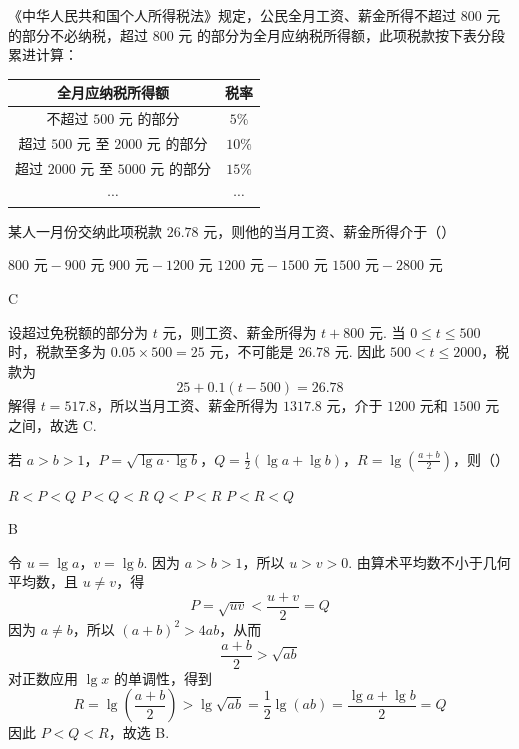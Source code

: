 \begin{problem}
《中华人民共和国个人所得税法》规定，公民全月工资、薪金所得不超过 \(800\text{ 元}\) 的部分不必纳税，超过 \(800\text{ 元}\) 的部分为全月应纳税所得额，此项税款按下表分段累进计算：

\begin{center}
\begin{tabular}{|c|c|}
\hline
全月应纳税所得额 & 税率 \\
\hline
不超过 \(500\text{ 元}\) 的部分 & \(5\%\) \\
\hline
超过 \(500\text{ 元}\) 至 \(2000\text{ 元}\) 的部分 & \(10\%\) \\
\hline
超过 \(2000\text{ 元}\) 至 \(5000\text{ 元}\) 的部分 & \(15\%\) \\
\hline
\(\cdots\) & \(\cdots\) \\
\hline
\end{tabular}
\end{center}

某人一月份交纳此项税款 \(26.78\text{ 元}\)，则他的当月工资、薪金所得介于（\quad）

\choices
    {\(800\text{ 元}-900\text{ 元}\)}
    {\(900\text{ 元}-1200\text{ 元}\)}
    {\(1200\text{ 元}-1500\text{ 元}\)}
    {\(1500\text{ 元}-2800\text{ 元}\)}
\end{problem}

\begin{answer}
C
\end{answer}

\begin{solution}
设超过免税额的部分为 \(t\) 元，则工资、薪金所得为 \(t+800\) 元. 当 \(0\leqslant t\leqslant500\) 时，税款至多为 \(0.05\times500=25\) 元，不可能是 \(26.78\) 元. 因此 \(500<t\leqslant2000\)，税款为
\[
25+0.1(t-500)=26.78
\]
解得 \(t=517.8\)，所以当月工资、薪金所得为 \(1317.8\) 元，介于 \(1200\) 元和 \(1500\) 元之间，故选 C.
\end{solution}

\begin{problem}
若 \(a>b>1\)，\(P=\sqrt{\lg a\cdot\lg b}\)，\(Q=\frac12\left(\lg a+\lg b\right)\)，\(R=\lg\left(\frac{a+b}{2}\right)\)，则（\quad）

\choices
    {\(R<P<Q\)}
    {\(P<Q<R\)}
    {\(Q<P<R\)}
    {\(P<R<Q\)}
\end{problem}

\begin{answer}
B
\end{answer}

\begin{solution}
令 \(u=\lg a\)，\(v=\lg b\). 因为 \(a>b>1\)，所以 \(u>v>0\). 由算术平均数不小于几何平均数，且 \(u\ne v\)，得
\[
P=\sqrt{uv}<\frac{u+v}{2}=Q
\]
因为 \(a\ne b\)，所以 \((a+b)^2>4ab\)，从而
\[
\frac{a+b}{2}>\sqrt{ab}
\]
对正数应用 \(\lg x\) 的单调性，得到
\[
R=\lg\left(\frac{a+b}{2}\right)>\lg\sqrt{ab}
=\frac12\lg(ab)=\frac{\lg a+\lg b}{2}=Q
\]
因此 \(P<Q<R\)，故选 B.
\end{solution}

